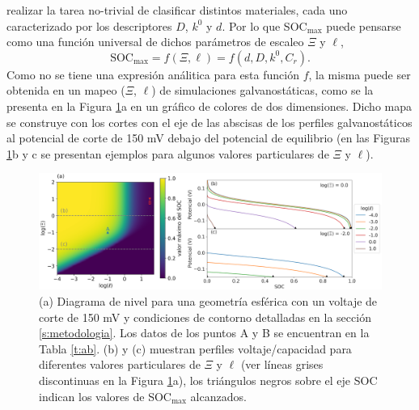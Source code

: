 realizar la tarea no-trivial de clasificar distintos materiales, cada uno 
caracterizado por los descriptores $D$, $k^0$ y $d$. Por lo que SOC$_{\max}$
puede pensarse como una función universal de dichos parámetros de escaleo $\Xi$ y $\ell$,
\begin{equation}\label{eq:socmax}
    \text{SOC}_{\max} = f(\Xi, \ell) = f(d, D, k^0, C_r).
\end{equation}
Como no se tiene una expresión análitica para esta función $f$, la misma puede ser 
obtenida en un mapeo ($\Xi$, $\ell$) de simulaciones galvanostáticas, como se la 
presenta en la Figura \ref{fig:diagnostico}a en un gráfico de colores de dos 
dimensiones. Dicho mapa se construye con los cortes con el eje de las abscisas de los perfiles galvanostáticos
al potencial de corte de 150 mV debajo del potencial de equilibrio (en las Figuras 
\ref{fig:diagnostico}b y c se presentan ejemplos para algunos valores particulares 
de $\Xi$ y $\ell$).
\begin{figure}[h!]
    \centering
    \includegraphics[width=\textwidth]{FastCharging/un/introduccion/diagnosis-merged.png}
    \caption{(a) Diagrama de nivel para una geometría esférica con un voltaje de 
    corte de 150 mV y condiciones de contorno detalladas en la sección 
    \ref{s:metodologia}. Los datos de los puntos A y B se encuentran en la 
    Tabla \ref{t:ab}. (b) y (c) muestran perfiles voltaje/capacidad para 
    diferentes valores particulares de $\Xi$ y $\ell$ (ver líneas grises 
    discontinuas en la Figura \ref{fig:diagnostico}a), los triángulos negros 
    sobre el eje SOC indican los valores de SOC$_{\max}$ alcanzados.}
    \label{fig:diagnostico}
\end{figure}

